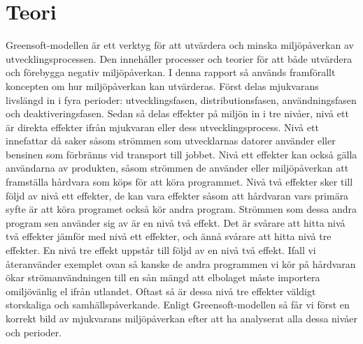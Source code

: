 \section{Teori}
\label{sec:joel_a-theory}

Greensoft-modellen är ett verktyg för att utvärdera och minska miljöpåverkan av utvecklingsprocessen. Den innehåller processer och teorier för att både utvärdera och förebygga negativ miljöpåverkan. I denna rapport så används framförallt koncepten om hur miljöpåverkan kan utvärderas. Först delas mjukvarans livslängd in i fyra perioder: utvecklingsfasen, distributionsfasen, användningsfasen och deaktiveringsfasen. Sedan så delas effekter på miljön in i tre nivåer, nivå ett är direkta effekter ifrån mjukvaran eller dess utvecklingsprocess. Nivå ett innefattar då saker såsom strömmen som utvecklarnas datorer använder eller bensinen som förbränns vid transport till jobbet. Nivå ett effekter kan också gälla användarna av produkten, såsom strömmen de använder eller miljöpåverkan att framställa hårdvara som köps för att köra programmet. Nivå två effekter sker till följd av nivå ett effekter, de kan vara effekter såsom att hårdvaran vars primära syfte är att köra programet också kör andra program. Strömmen som dessa andra program sen använder sig av är en nivå två effekt. Det är svårare att hitta nivå två effekter jämför med nivå ett effekter, och ännå svårare att hitta nivå tre effekter. En nivå tre effekt uppstår till följd av en nivå två effekt. Ifall vi återanvänder exemplet ovan så kanske de andra programmen vi kör på hårdvaran ökar strömanvändningen till en sån mängd att elbolaget måste importera omiljövänlig el ifrån utlandet. Oftast så är dessa nivå tre effekter väldigt storskaliga och samhällspåverkande. Enligt Greensoft-modellen så får vi först en korrekt bild av mjukvarans miljöpåverkan efter att ha analyserat alla dessa nivåer och perioder. 